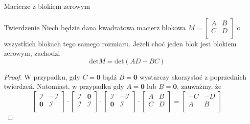 \documentclass{beamer}
\newcommand{\zero}{\mathbf{0}}
\newcommand{\id}{\mathcal{I}}
\renewcommand{\det}{\textrm{det}}
\begin{document}
\begin{frame}{Macierze z blokiem zerowym}
    \begin{block}{Twierdzenie}
        Niech będzie dana kwadratowa macierz blokowa $M = \begin{bmatrix}
            A & B \\ C & D \\  
        \end{bmatrix}$
        o wszystkich blokach tego samego rozmiaru. Jeżeli choć jeden blok jest blokiem zerowym, zachodzi
        $$\det M = \det (AD - BC)$$
    \end{block}
    \pause 
    \begin{proof}
        W przypadku, gdy $C= \zero$ bądź $B = \zero$ wystarczy skorzystać z poprzednich twierdzeń. Natomiast, w przypadku gdy $A = \zero$ lub $B = \zero$, zauważmy, że 
        $$\begin{bmatrix}
            \id & - \id \\ \zero & \id \\
        \end{bmatrix}
        \cdot \begin{bmatrix}
            \id & \zero \\ \id & \id \\
        \end{bmatrix}
        \cdot \begin{bmatrix}
            \id & - \id \\ \zero & \id \\
        \end{bmatrix} 
        \cdot \begin{bmatrix}
            A & B \\ C & D \\ 
        \end{bmatrix} = 
        \begin{bmatrix}
            -C & -D \\ A & B \\
        \end{bmatrix}
        $$
    \end{proof}    
\end{frame}
\end{document}
